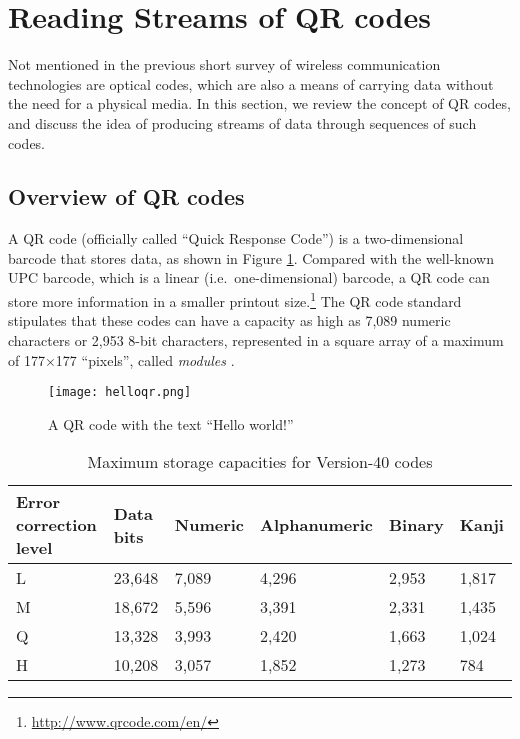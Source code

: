 
\section{Reading Streams of QR codes}\label{sec:qr:qrcode} %

Not mentioned in the previous short survey of wireless communication technologies are optical codes, which are also a means of carrying data without the need for a physical media. In this section, we review the concept of QR codes, and discuss the idea of producing streams of data through sequences of such codes.

\subsection{Overview of QR codes}

A QR code (officially called ``Quick Response Code'') \citep{qrcode-about} is a two-dimensional barcode that stores data, as shown in Figure \ref{fig:qr:helloqr}. Compared with the well-known UPC barcode, which is a linear (i.e.\ one-dimensional) barcode, a QR code can store more information in a smaller printout size.\footnote{\url{http://www.qrcode.com/en/}} The QR code standard stipulates that these codes can have a capacity as high as 7,089 numeric characters or 2,953 8-bit characters, represented in a square array of a maximum of 177$\times$177 ``pixels'', called \emph{modules} \citep{iso18004}. 

\begin{figure}
\centering
\texttt{[image: helloqr.png]}
\caption{A QR code with the text ``Hello world!''}
\label{fig:qr:helloqr}
\end{figure}

\begin{table}[t]
\begin{center}
\begin{tabular}{|l|l|l|l|l|l|}
\hline
\pbox[c][25pt][c]{\textwidth}{Error correction \\level} & Data bits & Numeric &	Alphanumeric & Binary & Kanji\\
\hline
L &	23,648 & 7,089 & 4,296 & 2,953 & 1,817\\
\hline
M & 18,672 & 5,596 & 3,391 & 2,331 & 1,435\\
\hline
Q & 13,328 & 3,993 & 2,420 & 1,663 & 1,024\\
\hline
H & 10,208 & 3,057 & 1,852 & 1,273 & 784\\
\hline
\end{tabular}
\caption[Capacities]{Maximum storage capacities for Version-40 codes}
\label{tab:qr:qrcode-capacity}
\end{center}
\end{table}

